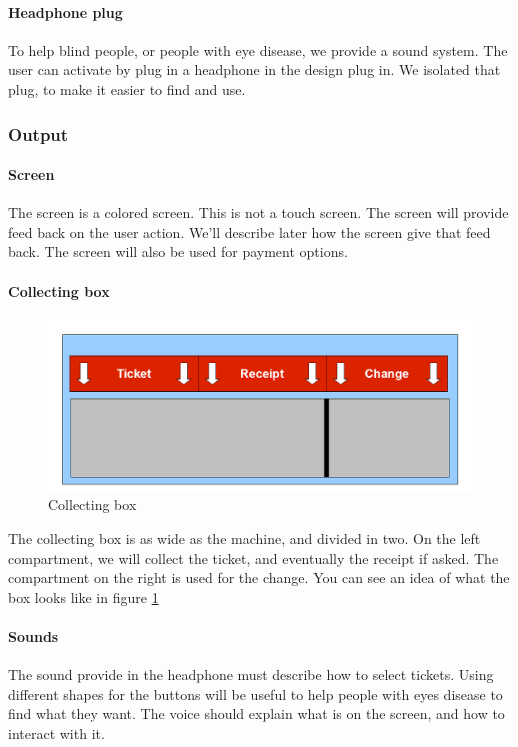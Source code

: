 \documentclass[a4paper,12pt]{article} %
\begin{document}
\paragraph{Headphone plug}
To help blind people, or people with eye disease, we provide a sound system. The user can activate by plug in a headphone in the design plug in. We isolated that plug, to make it easier to find and use.
\subsubsection{Output}
\paragraph{Screen}
The screen is a colored screen. This is not a touch screen. The screen will provide feed back on the user action. We'll describe later how the screen give that feed back. The screen will also be used for payment options.
\paragraph{Collecting box}
\begin{figure}[h!]
\includegraphics[width=1\linewidth]{interaction6.png}
\caption{\label{ticket6} Collecting box}
\end{figure}
The collecting box is as wide as the machine, and divided in two. On the left compartment, we will collect the ticket, and eventually the receipt if asked. The compartment on the right is used for the change. You can see an idea of what the box looks like in figure \ref{ticket6}
\paragraph{Sounds}
The sound provide in the headphone must describe how to select tickets. Using different shapes for the buttons will be useful to help people with eyes disease to find what they want. The voice should explain what is on the screen, and how to interact with it.
\end{document}

